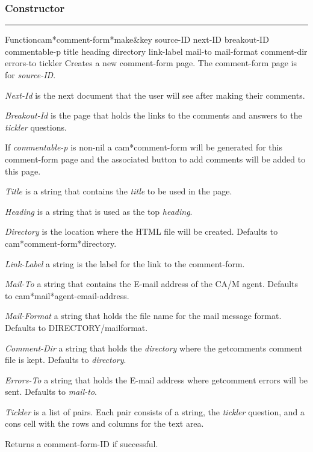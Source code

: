 \subsubsection*{Constructor}
\par\vspace*{0.00in}\par\hrule\par\medskip\par


\begin{functiondoc}{Function}{cam*comment-form*make}{\&key source-ID next-ID breakout-ID commentable-p title heading directory link-label mail-to mail-format comment-dir errors-to tickler}
Creates a new comment-form page.  The comment-form page is for {\em source-ID}.

{\em Next-Id} is the next document that the user will see after making their comments.

{\em Breakout-Id} is the page that holds the links to the comments and answers to the
 {\em tickler} questions.

If {\em commentable-p} is non-nil a cam*comment-form will be generated for this
 comment-form page and the associated button to add comments will be added to
 this page.

{\em Title} is a string that contains the {\em title} to be used in the page.

{\em Heading} is a string that is used as the top {\em heading}.

{\em Directory} is the location where the HTML file will be created.  Defaults to
 cam*comment-form*directory.

{\em Link-Label} a string is the label for the link to the comment-form.

{\em Mail-To} a string that contains the E-mail address of the CA/M agent.  Defaults to
 cam*mail*agent-email-address.

{\em Mail-Format} a string that holds the file name for the mail message format.
 Defaults to DIRECTORY/mailformat.

{\em Comment-Dir} a string that holds the {\em directory} where the getcomments comment file
 is kept.  Defaults to {\em directory}.

{\em Errors-To} a string that holds the E-mail address where getcomment errors will be sent.
 Defaults to {\em mail-to}.

{\em Tickler} is a list of pairs.  Each pair consists of a string, the {\em tickler} question, and
 a cons cell with the rows and columns for the text area.  

Returns a comment-form-ID if successful.
\end{functiondoc}



